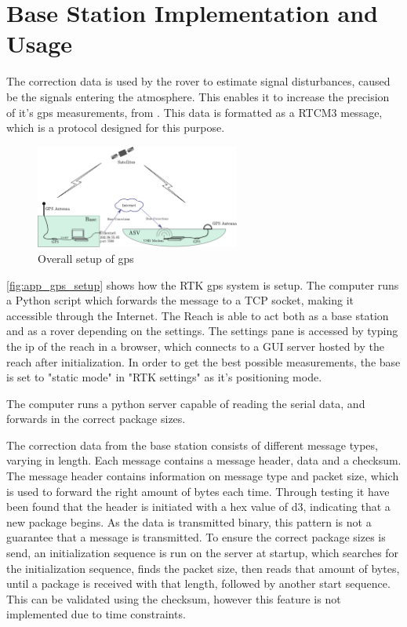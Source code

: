 \section*{Base Station Implementation and Usage}
The correction data is used by the rover to estimate signal disturbances, caused be the signals entering the atmosphere. 
This enables it to increase the precision of it's gps measurements, from .
This data is formatted as a RTCM3 message, which is a protocol designed for this purpose.
\begin{figure}[H]
	\includegraphics[width=0.6\textwidth]{figures/comunicationSetup.pdf}
	\caption{Overall setup of gps}
	\label{fig:app_gps_setup}
\end{figure}
\autoref{fig:app_gps_setup} shows how the RTK gps system is setup. 
The computer runs a Python script which forwards the message to a TCP socket, making it accessible through the Internet. 
The Reach is able to act both as a base station and as a rover depending on the settings.
The settings pane is accessed by typing the ip of the reach in a browser, which connects to a GUI server hosted by the reach after initialization.
In order to get the best possible measurements, the base is set to "static mode" in "RTK settings" as it's positioning mode.



The computer runs a python server capable of reading the serial data, and forwards in the correct package sizes.

The correction data from the base station consists of different message types, varying in length.
Each message contains a message header, data and a checksum. 
The message header contains information on message type and packet size, which is used to forward the right amount of bytes each time.
Through testing it have been found that the header is initiated with a hex value of d3, indicating that a new package begins. 
As the data is transmitted binary, this pattern is not a guarantee that a message is transmitted. 
To ensure the correct package sizes is send, an initialization sequence is run on the server at startup, which searches for the initialization sequence, finds the packet size, then reads that amount of bytes, until a package is received with that length, followed by another start sequence.
This can be validated using the checksum, however this feature is not implemented due to time constraints. 

